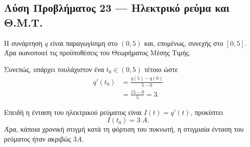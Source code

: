 \subsection*{Λύση Προβλήματος 23 --- Ηλεκτρικό ρεύμα και Θ.Μ.Τ.}

Η συνάρτηση $q$ είναι παραγωγίσιμη στο $(0,5)$ και, επομένως, συνεχής
στο $[0,5]$. Άρα ικανοποιεί τις προϋποθέσεις του Θεωρήματος Μέσης Τιμής.

Συνεπώς, υπάρχει τουλάχιστον ένα $t_0\in(0,5)$ τέτοιο ώστε
\begin{align*}
  q'(t_0)
  &=\frac{q(5)-q(0)}{5-0}\\
  &=\frac{15-0}{5}=3.
\end{align*}

Επειδή η ένταση του ηλεκτρικού ρεύματος είναι $I(t)=q'(t)$, προκύπτει
\[
  {I(t_0)=3\;\si{A}}.
\]
Άρα, κάποια χρονική στιγμή κατά τη φόρτιση του πυκνωτή, η στιγμιαία
ένταση του ρεύματος ήταν ακριβώς $3\si{A}$.
